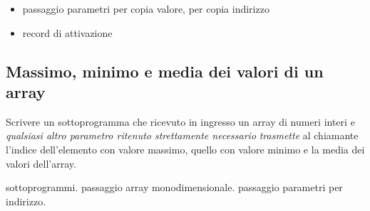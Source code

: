 \begin{itemize}
\item passaggio parametri per copia valore, per copia indirizzo
\item record di attivazione
\end{itemize}

\subsection{Massimo, minimo e media dei valori di un array}
Scrivere un sottoprogramma che ricevuto in ingresso un array di numeri interi e \textit{qualsiasi altro parametro ritenuto strettamente necessario} \textit{trasmette} al chiamante l'indice dell'elemento con valore massimo, quello con valore minimo e la media dei valori dell'array.

\begin{tags}
sottoprogrammi. passaggio array monodimensionale. passaggio parametri per indirizzo.
\end{tags}


